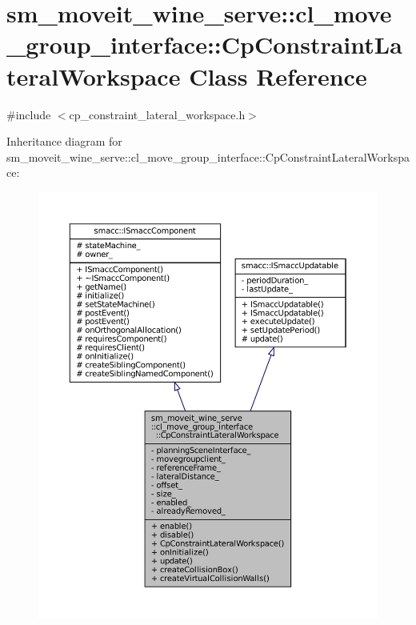 \hypertarget{classsm__moveit__wine__serve_1_1cl__move__group__interface_1_1CpConstraintLateralWorkspace}{}\section{sm\+\_\+moveit\+\_\+wine\+\_\+serve\+:\+:cl\+\_\+move\+\_\+group\+\_\+interface\+:\+:Cp\+Constraint\+Lateral\+Workspace Class Reference}
\label{classsm__moveit__wine__serve_1_1cl__move__group__interface_1_1CpConstraintLateralWorkspace}


{\ttfamily \#include $<$cp\+\_\+constraint\+\_\+lateral\+\_\+workspace.\+h$>$}



Inheritance diagram for sm\+\_\+moveit\+\_\+wine\+\_\+serve\+:\+:cl\+\_\+move\+\_\+group\+\_\+interface\+:\+:Cp\+Constraint\+Lateral\+Workspace\+:
\nopagebreak
\begin{figure}[H]
\begin{center}
\leavevmode
\includegraphics[width=350pt]{classsm__moveit__wine__serve_1_1cl__move__group__interface_1_1CpConstraintLateralWorkspace__inherit__graph}
\end{center}
\end{figure}


